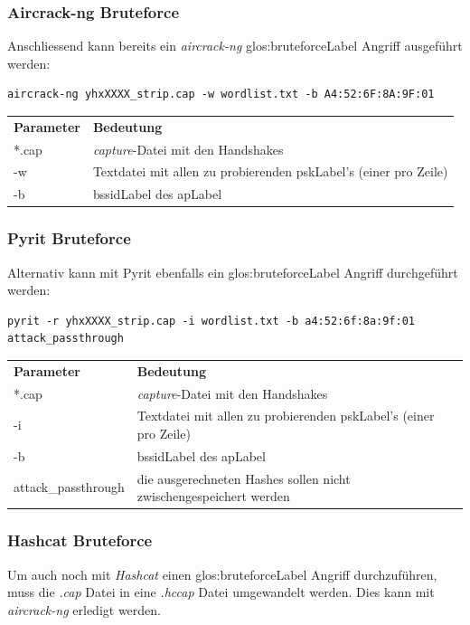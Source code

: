 \subsubsection{Aircrack-ng Bruteforce}
Anschliessend kann bereits ein \textit{aircrack-ng} \gls{glos:bruteforceLabel} Angriff ausgeführt werden:
\begin{lstlisting}[style=lstStyleFramed]
aircrack-ng yhxXXXX_strip.cap -w wordlist.txt -b A4:52:6F:8A:9F:01
\end{lstlisting}
\begin{tabular}{l l}
	\textbf{Parameter} & \textbf{Bedeutung}\\
	*.cap & \textit{capture}-Datei mit den Handshakes\\
	-w	& Textdatei mit allen zu probierenden \gls{pskLabel}'s (einer pro Zeile)\\
	-b	& \gls{bssidLabel} des \gls{apLabel}\\
\end{tabular}

\subsubsection{Pyrit Bruteforce}
Alternativ kann mit Pyrit ebenfalls ein \gls{glos:bruteforceLabel} Angriff durchgeführt werden:
\begin{lstlisting}[style=lstStyleFramed]
pyrit -r yhxXXXX_strip.cap -i wordlist.txt -b a4:52:6f:8a:9f:01 attack_passthrough
\end{lstlisting}
\begin{tabular}{l l}
	\textbf{Parameter} & \textbf{Bedeutung}\\
	*.cap & \textit{capture}-Datei mit den Handshakes\\
	-i	& Textdatei mit allen zu probierenden \gls{pskLabel}'s (einer pro Zeile)\\
	-b	& \gls{bssidLabel} des \gls{apLabel}\\
	attack\_passthrough & die ausgerechneten Hashes sollen nicht zwischengespeichert werden\\
\end{tabular}


\subsubsection{Hashcat Bruteforce}
Um auch noch mit \textit{Hashcat} einen \gls{glos:bruteforceLabel} Angriff durchzuführen, muss die \textit{.cap} Datei in eine \textit{.hccap} Datei umgewandelt werden. Dies kann mit \textit{aircrack-ng} erledigt werden.

